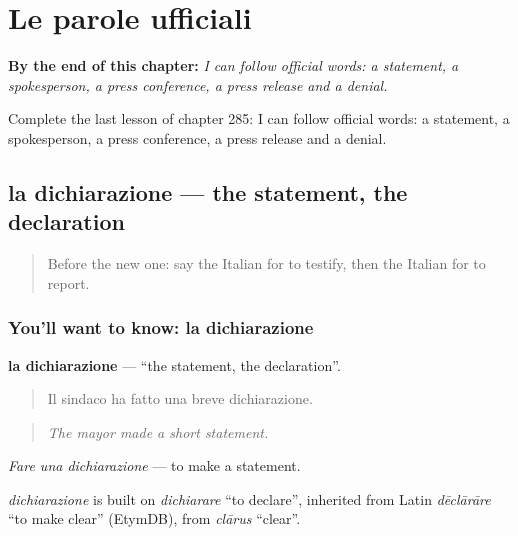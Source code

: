 
\chapter{Le parole ufficiali}
\label{ch:it-le-parole-ufficiali}

\begin{chapteropening}
\textbf{By the end of this chapter:} \emph{I can follow official words: a statement, a spokesperson, a press conference, a press release and a denial.}

Complete the last lesson of chapter 285: I can follow official words: a statement, a spokesperson, a press conference, a press release and a denial.
\end{chapteropening}

\section[la dichiarazione]{la dichiarazione — the statement, the declaration}

\label{lesson:IT-C285-dichiarazione}



\begin{quote}
Before the new one: say the Italian for to testify, then the Italian for to report.
\end{quote}

\subsection*{You'll want to know: la dichiarazione}
\textbf{la dichiarazione} — \textquotedblleft{}the statement, the declaration\textquotedblright{}.

\begin{quote}
Il sindaco ha fatto una breve dichiarazione.
\end{quote}

\begin{quote}
\emph{The mayor made a short statement.}
\end{quote}

\emph{Fare una dichiarazione} — to make a statement.

\begin{cousinweb}
\emph{dichiarazione} is built on \emph{dichiarare} \textquotedblleft{}to declare\textquotedblright{}, inherited from Latin \emph{dēclārāre} \textquotedblleft{}to make clear\textquotedblright{} (EtymDB), from \emph{clārus} \textquotedblleft{}clear\textquotedblright{}.
\end{cousinweb}

